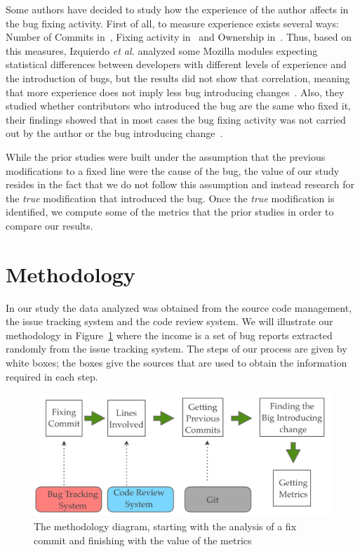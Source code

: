 \documentclass[10pt, conference]{IEEEtran}
\begin{document}
Some authors have decided to study how the experience of the author affects in the bug fixing activity. First of all, to measure experience exists several ways: Number of Commits in~\cite{eyolfson2011time}, Fixing activity in~\cite{ahsan2010mining} and Ownership in~\cite{german2004using}. Thus, based on this measures, Izquierdo \emph{et al.} analyzed some Mozilla modules expecting statistical differences between developers with different levels of experience and the introduction of bugs, but the results did not show that correlation, meaning that more experience does not imply less bug introducing changes~\cite{izquierdo2012more}. Also, they studied whether contributors who introduced the bug are the same who fixed it, their findings showed that in most cases the bug fixing activity was not carried out by the author or the bug introducing change~\cite{izquierdo2011developers}.


While the prior studies were built under the assumption that the previous modifications to a fixed line were the cause of the bug, the value of our study resides in the fact that we do not follow this assumption and instead research for the \emph{true} modification that introduced the bug. Once the \emph{true} modification is identified, we compute some of the metrics that the prior studies in order to compare our results. 

\section{Methodology}
\label{sec:methodology}

In our study the data analyzed was obtained from the source code management, the issue tracking system and the code review system. We will illustrate our methodology in Figure~\ref{fig:methodology} where the income is a set of bug reports extracted randomly from the issue tracking system. The steps of our process are given by white boxes; the  boxes give the sources that are used to obtain the information required in each step.

\begin{figure}[ht]
\centering
\includegraphics[width=\columnwidth]{methodology.png}
\caption{The methodology diagram, starting with the analysis of a fix commit and finishing with the value of the metrics}
\label{fig:methodology}       %
\end{figure}
\end{document}
